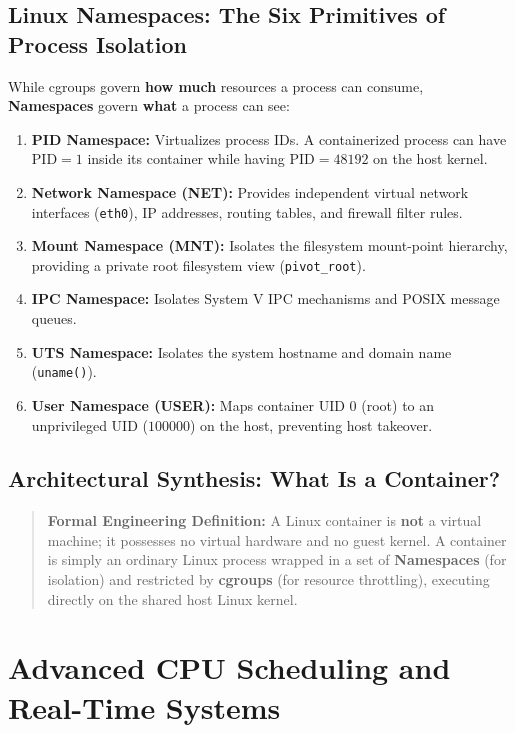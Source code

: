 \subsection{Linux Namespaces: The Six Primitives of Process Isolation}
While cgroups govern \textbf{how much} resources a process can consume, \textbf{Namespaces} govern \textbf{what} a process can see:
\begin{enumerate}
    \item \textbf{PID Namespace:} Virtualizes process IDs. A containerized process can have $\text{PID} = 1$ inside its container while having $\text{PID} = 48192$ on the host kernel.
    \item \textbf{Network Namespace (NET):} Provides independent virtual network interfaces (\texttt{eth0}), IP addresses, routing tables, and firewall filter rules.
    \item \textbf{Mount Namespace (MNT):} Isolates the filesystem mount-point hierarchy, providing a private root filesystem view (\texttt{pivot\_root}).
    \item \textbf{IPC Namespace:} Isolates System V IPC mechanisms and POSIX message queues.
    \item \textbf{UTS Namespace:} Isolates the system hostname and domain name (\texttt{uname()}).
    \item \textbf{User Namespace (USER):} Maps container UID 0 (root) to an unprivileged UID ($100000$) on the host, preventing host takeover.
\end{enumerate}

\subsection{Architectural Synthesis: What Is a Container?}
\begin{quote}
\textbf{Formal Engineering Definition:} A Linux container is \textbf{not} a virtual machine; it possesses no virtual hardware and no guest kernel. A container is simply an ordinary Linux process wrapped in a set of \textbf{Namespaces} (for isolation) and restricted by \textbf{cgroups} (for resource throttling), executing directly on the shared host Linux kernel.
\end{quote}

\section{Advanced CPU Scheduling and Real-Time Systems}
\label{sec:os_adv_scheduling}

